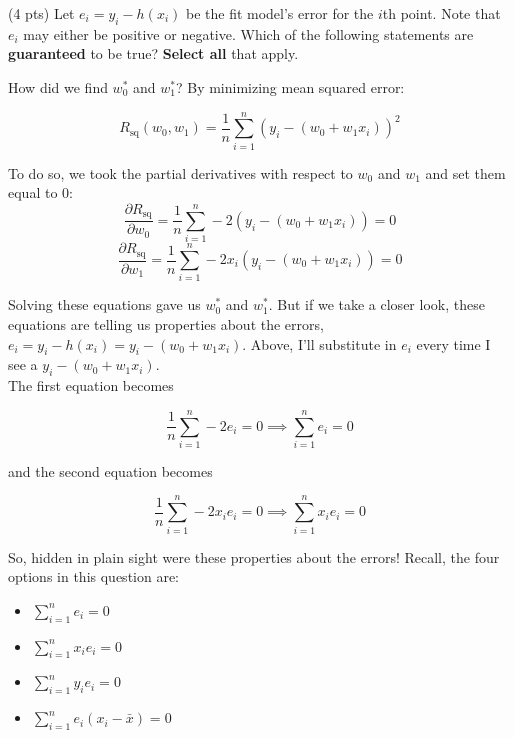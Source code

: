 \documentclass[11pt]{article}
\begin{document}
\begin{prob}[(14 pts)]
\begin{subprob}(4 pts) Let $e_i=y_i-h(x_i)$ be the fit model's error for the $i$th point. Note that $e_i$ may either be positive or negative. Which of the following statements are \textbf{guaranteed} to be true? \textbf{Select all} that apply. \\

 \hspace{0.25in}
 \hspace{0.25in}
 \hspace{0.25in}
\begin{solution}
How did we find $w_0^*$ and $w_1^*$? By minimizing mean squared error:

$$R_\text{sq}(w_0, w_1) = \frac{1}{n} \sum_{i=1}^n (y_i - (w_0 + w_1 x_i))^2$$

To do so, we took the partial derivatives with respect to $w_0$ and $w_1$ and set them equal to 0:
\[
\frac{\partial R_\text{sq}}{\partial w_0} = \frac{1}{n} \sum_{i=1}^n -2(y_i - (w_0 + w_1 x_i)) = 0
\]
\[
\frac{\partial R_\text{sq}}{\partial w_1} = \frac{1}{n} \sum_{i=1}^n -2x_i(y_i - (w_0 + w_1 x_i)) = 0
\]

Solving these equations gave us $w_0^*$ and $w_1^*$. But if we take a closer look, these equations are telling us properties about the errors, $e_i = y_i - h(x_i) = y_i - (w_0 + w_1 x_i)$. Above, I'll substitute in $e_i$ every time I see a $y_i - (w_0 + w_1 x_i)$. \\

The first equation becomes

$$\frac{1}{n} \sum_{i=1}^n -2e_i = 0 \implies \sum_{i=1}^n e_i = 0$$

and the second equation becomes

$$\frac{1}{n} \sum_{i=1}^n -2x_i e_i = 0 \implies \sum_{i=1}^n x_i e_i = 0$$

So, hidden in plain sight were these properties about the errors! Recall, the four options in this question are:
\begin{itemize}
  \item $\displaystyle\sum_{i=1}^n e_i=0$
  \item $\displaystyle\sum_{i=1}^n x_i e_i=0$
  \item $\displaystyle\sum_{i=1}^n y_i e_i=0$
  \item $\displaystyle\sum_{i=1}^n e_i(x_i-\bar x)=0$
\end{itemize}


\end{solution}
\end{subprob}
\end{prob}
\end{document}

